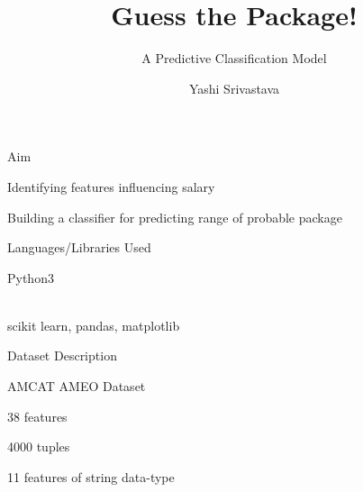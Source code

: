 \documentclass[14pt]{beamer}
\title{Guess the Package!}
\subtitle{A Predictive Classification Model}
\author{Yashi Srivastava}
\institute{TalentSprint}
\begin{document}
\begin{frame}[plain]
\maketitle
\end{frame}

\begin{frame}{Aim}
\renewcommand{\labelitemi}{$\square $}
 \begin{fullpageitemize}
  \item Identifying features influencing salary
  \pause
  \item Building a classifier for predicting range of probable package
 \end{fullpageitemize}
\end{frame}
\begin{frame}{Languages/Libraries Used}
\pause
\renewcommand{\labelitemi}{$\square $}
 \begin{fullpageitemize}
  \item Python3 
  \\~\
  \item scikit learn, pandas, matplotlib
 \end{fullpageitemize}
\end{frame}
\begin{frame}{Dataset Description}
\pause
\renewcommand{\labelitemi}{$\square $}
 \begin{fullpageitemize}
  \item AMCAT AMEO Dataset 
  \item 38 features 
  \item 4000 tuples 
  \item 11 features of string data-type
 \end{fullpageitemize}
\end{frame}
\end{document}
